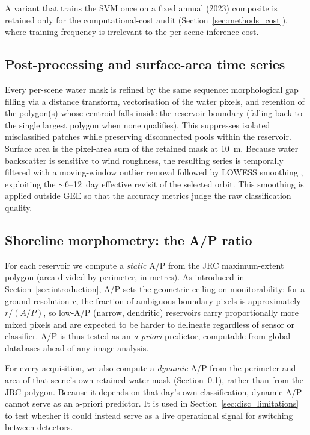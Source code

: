 A variant that trains the SVM once on a fixed annual (2023) composite is
retained only for the computational-cost audit
(Section~\ref{sec:methods_cost}), where training frequency is irrelevant to the
per-scene inference cost.

\subsection{Post-processing and surface-area time series}
\label{sec:methods_postproc}

Every per-scene water mask is refined by the same sequence: morphological gap
filling via a distance transform, vectorisation of the water pixels, and
retention of the polygon(s) whose centroid falls inside the reservoir boundary
(falling back to the single largest polygon when none qualifies). This
suppresses isolated misclassified patches while preserving disconnected pools
within the reservoir. Surface area is the pixel-area sum of the retained mask
at 10~m. Because water backscatter is sensitive to wind roughness, the
resulting series is temporally filtered with a moving-window outlier removal
followed by LOWESS smoothing \citep{Cleveland1979}, exploiting the
$\sim$6--12~day effective revisit
of the selected orbit. This smoothing is applied outside GEE so that the
accuracy metrics judge the raw classification quality.

\subsection{Shoreline morphometry: the A/P ratio}
\label{sec:methods_ap}

For each reservoir we compute a \emph{static} A/P from the JRC
maximum-extent polygon (area divided by perimeter, in metres). As introduced
in Section~\ref{sec:introduction}, A/P sets
the geometric ceiling on monitorability: for a ground resolution $r$, the
fraction of ambiguous boundary pixels is approximately $r/(A/P)$, so
low-A/P (narrow, dendritic) reservoirs carry proportionally more mixed pixels
and are expected to be harder to delineate regardless of sensor or classifier.
A/P is thus tested as an \emph{a-priori} predictor, computable from
global databases ahead of any image analysis.

For every acquisition, we also compute a \emph{dynamic} A/P from the
perimeter and area of that scene's own retained water mask
(Section~\ref{sec:methods_postproc}), rather than from the JRC polygon.
Because it depends on that day's own classification, dynamic A/P cannot
serve as an a-priori predictor. It is used in
Section~\ref{sec:disc_limitations} to test whether it could instead serve as
a live operational signal for switching between detectors.

